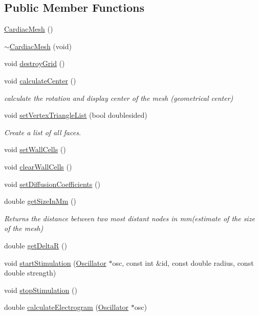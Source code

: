 \subsection*{Public Member Functions}
\begin{DoxyCompactItemize}
\item 
\hyperlink{class_cardiac_mesh_a864c30e0e6cdab5e1a1e39ab99a45e5b}{Cardiac\+Mesh} ()
\item 
\hyperlink{class_cardiac_mesh_a91b0200d15669cbdef50c3d8a6ad523f}{$\sim$\+Cardiac\+Mesh} (void)
\item 
void \hyperlink{class_cardiac_mesh_ac4e6a0774e1b1abf2ddbf2cc59434a92}{destroy\+Grid} ()
\item 
void \hyperlink{class_cardiac_mesh_a92f03d96fb065ce0d12b3865182ec1b7}{calculate\+Center} ()
\begin{DoxyCompactList}\small\item\em calculate the rotation and display center of the mesh (geometrical center) \end{DoxyCompactList}\item 
void \hyperlink{class_cardiac_mesh_ae6002bc62e88a0a4b21ba222adc04e25}{set\+Vertex\+Triangle\+List} (bool doublesided)
\begin{DoxyCompactList}\small\item\em Create a list of all faces. \end{DoxyCompactList}\item 
void \hyperlink{class_cardiac_mesh_ae84e8d8f86a437e47ea99d1bf212e2ce}{set\+Wall\+Cells} ()
\item 
void \hyperlink{class_cardiac_mesh_a45cb6c32debebdc827e2c4f48e8f5ce2}{clear\+Wall\+Cells} ()
\item 
void \hyperlink{class_cardiac_mesh_a5fb6507c440aeb2d947663047fbdac92}{set\+Diffusion\+Coefficients} ()
\item 
double \hyperlink{class_cardiac_mesh_a67e146331d7c41e3d528861594ac577e}{get\+Size\+In\+Mm} ()
\begin{DoxyCompactList}\small\item\em Returns the distance between two most distant nodes in mm(estimate of the size of the mesh) \end{DoxyCompactList}\item 
double \hyperlink{class_cardiac_mesh_ab4705e8f6f5657337295f076494e9a45}{get\+Delta\+R} ()
\item 
void \hyperlink{class_cardiac_mesh_afb67d1d5f4e382916e9c8f044739887b}{start\+Stimulation} (\hyperlink{class_oscillator}{Oscillator} $\ast$osc, const int \&id, const double radius, const double strength)
\item 
void \hyperlink{class_cardiac_mesh_a5b11cbba123533dcf60e5bf1a7bba9cc}{stop\+Stimulation} ()
\item 
double \hyperlink{class_cardiac_mesh_abf74825fdb7bc14445c25877f06e36af}{calculate\+Electrogram} (\hyperlink{class_oscillator}{Oscillator} $\ast$osc)
\end{DoxyCompactItemize}

